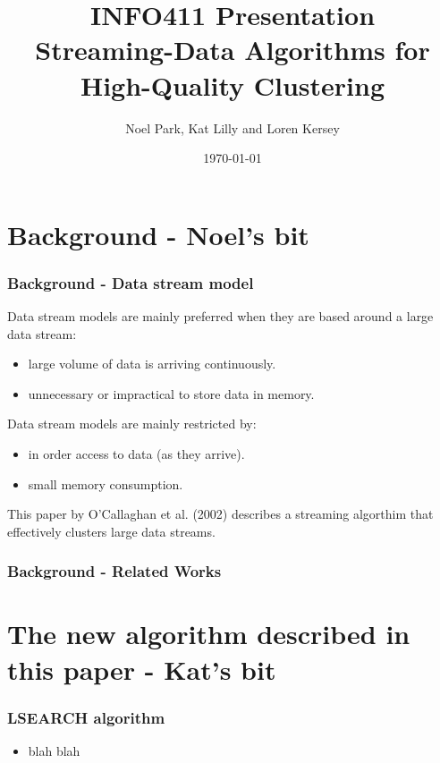 \documentclass{beamer}
\title{INFO411 Presentation \\ Streaming-Data Algorithms for High-Quality Clustering}
\author{Noel Park, Kat Lilly and Loren Kersey}
\date{\today}
\begin{document}
\frame{\titlepage}

\section[Outline]{}
\frame{\tableofcontents}

\section{Background - Noel's bit}

\frame
{
  \frametitle{Background - Data stream model}
  
  Data stream models are mainly preferred when they are based around a large data stream:

  \begin{itemize}
    \item large volume of data is arriving continuously.
    \item unnecessary or impractical to store data in memory.
    \newline
  \end{itemize}

  Data stream models are mainly restricted by:
  \begin{itemize}
    \item in order access to data (as they arrive).
    \item small memory consumption.
    \newline
  \end{itemize}

  This paper by O'Callaghan et al. (2002) describes a streaming algorthim that effectively clusters large data streams.

}

\frame
{
  \frametitle{Background - Related Works}
  

}

\section{The new algorithm described in this paper - Kat's bit}
\frame
{
  \frametitle{LSEARCH algorithm}

  \begin{itemize}
  \item  blah blah
  \end{itemize}
}
\end{document}

